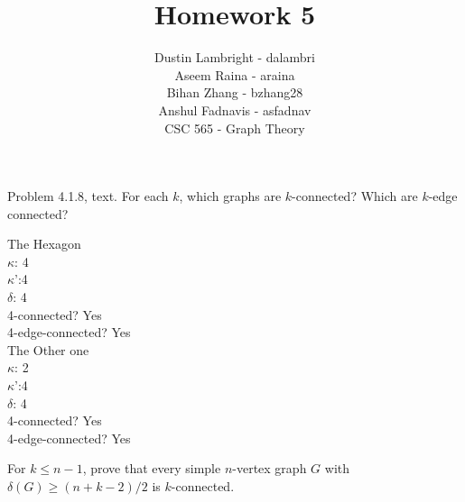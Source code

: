 \documentclass[12pt]{article}
\newenvironment{question}[2][Question]{\begin{trivlist}
\item[\hskip \labelsep {\bfseries #1}\hskip \labelsep {\bfseries #2.}]}{\end{trivlist}}
\begin{document}


\title{Homework 5}%
\author{Dustin Lambright - dalambri \\ Aseem Raina - araina \\ Bihan Zhang - bzhang28 \\ Anshul Fadnavis - asfadnav\\
CSC 565 - Graph Theory} %

\maketitle


\begin{question}{1}
Problem 4.1.8, text. For each $k$, which graphs are $k$-connected? Which are $k$-edge connected?
\end{question}

\noindent
The Hexagon \\
$\kappa$: 4 \\
$\kappa$':4 \\
$\delta$: 4 \\
4-connected? Yes \\
4-edge-connected? Yes  \\
The Other one \\
$\kappa$: 2 \\
$\kappa$':4 \\
$\delta$: 4 \\
4-connected? Yes \\
4-edge-connected? Yes

\begin{question}{2}
For $k \leq n - 1$, prove that every simple $n$-vertex graph $G$ with $\delta(G) \geq (n+k-2)/2$ is $k$-connected.
\end{question}
\end{document}
